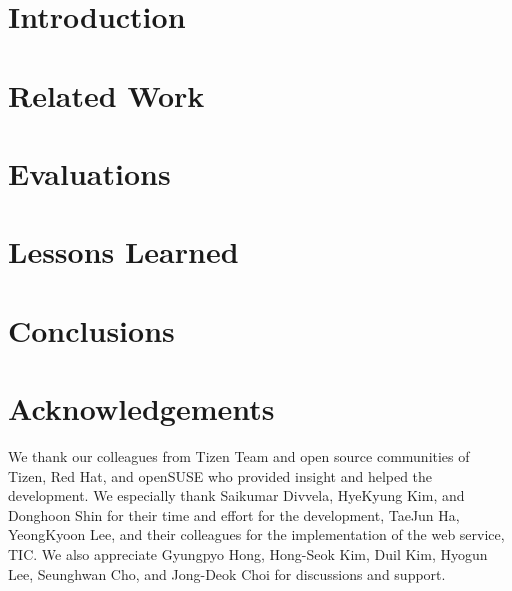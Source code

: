 \documentclass[10pt,conference,letterpaper]{IEEEtran}
\begin{document}
\section{Introduction}\label{S_intro}


\section{Related Work}\label{S_related}




\section{Evaluations}\label{S_eval}


\section{Lessons Learned}\label{S_lessons}


\section{Conclusions}\label{S_conc}


\section*{Acknowledgements}

We thank our colleagues from Tizen Team and open source communities of Tizen, Red Hat, and openSUSE who provided insight and helped the development.
We especially thank Saikumar Divvela, HyeKyung Kim, and Donghoon Shin for their time and effort for the development, TaeJun Ha, YeongKyoon Lee, and their colleagues for the implementation of the web service, TIC. We also appreciate Gyungpyo Hong, Hong-Seok Kim, Duil Kim, Hyogun Lee, Seunghwan Cho, and Jong-Deok Choi for discussions and support.


%

% 



\end{document}
